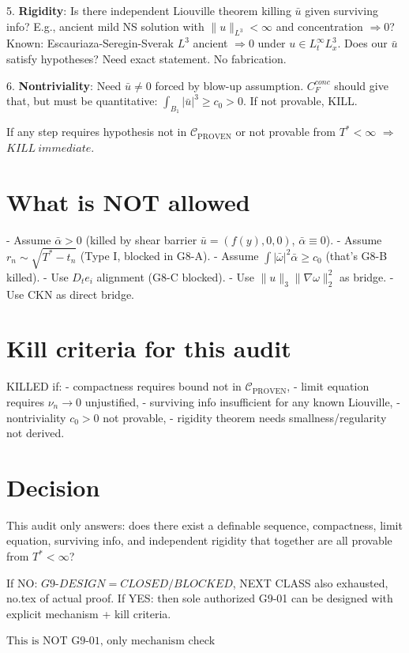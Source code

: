 \documentclass[11pt]{article}
\begin{document}
5. \textbf{Rigidity}: Is there independent Liouville theorem killing $\bar u$ given surviving info? E.g., ancient mild NS solution with $\|u\|_{L^3}<\infty$ and concentration $\Rightarrow0$? Known: Escauriaza-Seregin-Sverak $L^3$ ancient $\Rightarrow0$ under $u\in L^\infty_t L^3_x$. Does our $\bar u$ satisfy hypotheses? Need exact statement. No fabrication.

6. \textbf{Nontriviality}: Need $\bar u\neq0$ forced by blow-up assumption. $C_F^{conc}$ should give that, but must be quantitative: $\int_{B_1}|\bar u|^3\ge c_0>0$. If not provable, KILL.

If any step requires hypothesis not in $\mathcal C_{\mathrm{PROVEN}}$ or not provable from $T^*<\infty$ $\Rightarrow$ $\boxed{KILL\ immediate}$.

\section{What is NOT allowed}
- Assume $\bar\alpha>0$ (killed by shear barrier $\bar u=(f(y),0,0)$, $\bar\alpha\equiv0$).
- Assume $r_n\sim\sqrt{T^*-t_n}$ (Type I, blocked in G8-A).
- Assume $\int|\bar\omega|^2\bar\alpha\ge c_0$ (that's G8-B killed).
- Use $D_te_i$ alignment (G8-C blocked).
- Use $\|u\|_3\|\nabla\omega\|_2^2$ as bridge.
- Use CKN as direct bridge.

\section{Kill criteria for this audit}
KILLED if:
- compactness requires bound not in $\mathcal C_{\mathrm{PROVEN}}$,
- limit equation requires $\nu_n\to0$ unjustified,
- surviving info insufficient for any known Liouville,
- nontriviality $c_0>0$ not provable,
- rigidity theorem needs smallness/regularity not derived.

\section{Decision}
This audit only answers: does there exist a definable sequence, compactness, limit equation, surviving info, and independent rigidity that together are all provable from $T^*<\infty$?

If NO: $\boxed{G9\text{-}DESIGN=CLOSED/BLOCKED}$, NEXT CLASS also exhausted, no.tex of actual proof.
If YES: then sole authorized G9-01 can be designed with explicit mechanism + kill criteria.

$\boxed{\text{This is NOT G9-01, only mechanism check}}$
\end{document}
